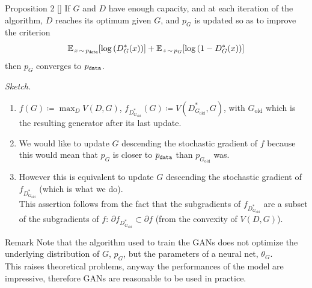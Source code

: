 \documentclass{beamer}
\begin{document}
	\begin{frame}
		\begin{block}{Proposition 2 \hfill [\citeauthor{goodfellow2014}]}
			If $G$ and $D$ have enough capacity, and at each iteration of the algorithm, $D$ reaches its optimum given $G$, and $p_G$ is updated so as to improve the criterion
			\vspace{-0.3cm}
			\begin{equation*}
				\mean[x \sim p_\text{\texttt{data}}]{\log{D^*_G(x)}} + \mean[z \sim p_G]{\log{1 - D^*_G(x)}}
			\end{equation*}
			\vskip -0.3cm
			then $p_G$ converges to $p_\text{\texttt{data}}$.
		\end{block}
		\textit{Sketch.} 
		\begin{enumerate}
			\item $f(G) \coloneqq \max_D V(D, G)$, $f_{D^*_{G_\text{old}}}(G) \coloneqq V(D^*_{G_\text{old}}, G)$, with $G_\text{old}$ which is the resulting generator after its last update.
			\item We would like to update $G$ descending the stochastic gradient of $f$ because this would mean that $p_G$ is closer to $p_\text{\texttt{data}}$ than $p_{G_\text{old}}$ was.
		\end{enumerate}
	\end{frame}
	
	\begin{frame}
		\begin{enumerate}\setcounter{enumi}{2}
			\item However this is equivalent to update $G$ descending the stochastic gradient of $f_{D^*_{G_\text{old}}}$ (which is what we do). \\
			This assertion follows from the fact that the subgradients of $f_{D^*_{G_\text{old}}}$ are a subset of the subgradients of $f$: $\partial f_{D^*_{G_\text{old}}} \subset \partial f$ (from the convexity of $V(D, G)$).
		\end{enumerate}
		\begin{block}{Remark}
			Note that the algorithm used to train the GANs does not optimize the underlying distribution of $G$, $p_G$, but the parameters of a neural net, $\theta_G$. \\
			\medskip
			This raises theoretical problems, anyway the performances of the model are impressive, therefore GANs are reasonable to be used in practice.
		\end{block}
	\end{frame}
\end{document}
